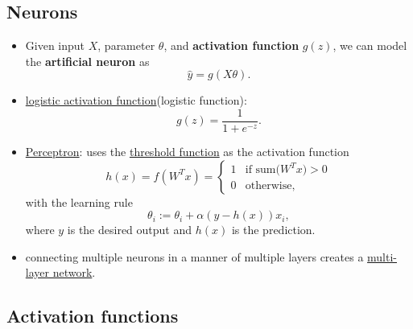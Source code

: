 \documentclass[twocolumn,landscape,10pt]{article}
\theoremstyle{definition}
\begin{document}
\subsection{Neurons}

\begin{itemize}
    \item Given input $X$, parameter $\theta$, and \textbf{activation function}
        $g(z)$, we can model the \textbf{artificial neuron} as
        \[
            \hat{y}=g(X\theta).
        \]
    \item \underline{logistic activation function}(logistic function): 
        \[
            g(z)=\frac{1}{1+e^{-z}}.
        \]
    \item \underline{Perceptron}: uses the \underline{threshold function} as the
        activation function
        \[
            h(x) = f(W^Tx) =
            \begin{cases}
                1 & \text{if sum($W^Tx$)} > 0 \\
                0 & \text{otherwise},
            \end{cases} 
        \]
        with the learning rule
        \[
            \theta_i := \theta_i + \alpha(y-h(x))x_i,
        \]
        where $y$ is the desired output and $h(x)$ is the prediction.
    \item connecting multiple neurons in a manner of multiple layers creates a
        \underline{multi-layer network}.
\end{itemize} 

\subsection{Activation functions}
\end{document}
